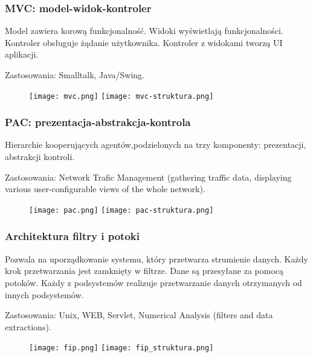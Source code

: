 \documentclass[../main.tex]{subfiles}
\begin{document}
    \subsubsection{MVC: model-widok-kontroler}
    Model zawiera korową funkcjonalność. Widoki wyświetlają funkcjonalności. Kontroler obsługuje żądanie użytkownika. Kontroler z widokami tworzą UI aplikacji.

    Zastosowania: Smalltalk, Java/Swing.

    \begin{figure}[H]
        \texttt{[image: mvc.png]}
        \texttt{[image: mvc-struktura.png]}
    \end{figure}



    \subsubsection{PAC: prezentacja-abstrakcja-kontrola}
    Hierarchie kooperujących agentów,podzielonych na trzy komponenty: prezentacji, abstrakcji kontroli.

    Zastosowania: Network Trafic Management (gathering traffic data, displaying various user-configurable
    views of the whole network).

    \begin{figure}[h]
        \texttt{[image: pac.png]}
        \texttt{[image: pac-struktura.png]}
    \end{figure}



    \subsubsection{Architektura filtry i potoki}

    Pozwala na uporządkowanie systemu, który przetwarza strumienie danych. Każdy krok przetwarzania jest zamknięty w filtrze.
    Dane są przesyłane za pomocą potoków. Każdy z podsystemów realizuje przetwarzanie danych otrzymanych od innych podsystemów.

    Zastosowania: Unix, WEB, Servlet, Numerical Analysis (filters and data extractions).

    \begin{figure}[h]
        \texttt{[image: fip.png]}
        \texttt{[image: fip\_struktura.png]}
    \end{figure}
\end{document}
